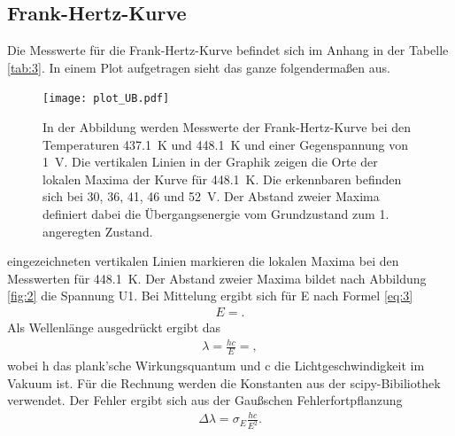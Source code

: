 \subsection{Frank-Hertz-Kurve}

Die Messwerte für die Frank-Hertz-Kurve befindet sich im Anhang in der Tabelle \ref{tab:3}.
In einem Plot aufgetragen sieht das ganze folgendermaßen aus.

\begin{figure}[H]
    \centering
    \texttt{[image: plot\_UB.pdf]}
    \caption{
        In der Abbildung werden Messwerte der
        Frank-Hertz-Kurve bei den Temperaturen \SI{437.1}{\kelvin} und \SI{448.1}{\kelvin} und einer Gegenspannung von \SI{1}{\volt}.
        Die vertikalen Linien in der Graphik zeigen die Orte der lokalen Maxima der Kurve für \SI{448.1}{\kelvin}. Die erkennbaren
        befinden sich bei 30, 36, 41, 46 und \SI{52}{\volt}. Der Abstand zweier 
        Maxima definiert dabei die Übergangsenergie vom Grundzustand zum 1.
        angeregten Zustand.
    }
    \label{fig:7} 
\end{figure}
 eingezeichneten vertikalen Linien markieren die lokalen Maxima bei den
Messwerten für \SI{448.1}{\kelvin}. Der Abstand zweier Maxima bildet nach 
Abbildung \ref{fig:2} die Spannung U1. Bei Mittelung ergibt sich für E nach Formel \eqref{eq:3}
\begin{align}
    E = \text{}. \label{eq:7} 
\end{align}
Als Wellenlänge ausgedrückt ergibt das
\begin{align}
    \lambda = \frac{h c}{E} = \text{}  , \label{eq:8} 
\end{align}
wobei h das plank'sche Wirkungsquantum und c die Lichtgeschwindigkeit im Vakuum ist.
Für die Rechnung  werden die Konstanten aus der scipy-Bibiliothek  verwendet.
Der Fehler ergibt sich aus der Gaußschen Fehlerfortpflanzung
\begin{align}
    \Delta \lambda = \sigma _{E}  \frac{h c}{E^2}. \label{eq:9} 
\end{align}




